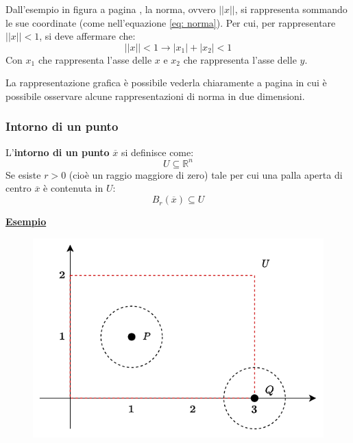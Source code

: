 \documentclass[a4paper]{article}
\newcommand{\definition}[1]{\textcolor{Red3}{\textbf{#1}}}
\newcommand{\example}[1]{\textcolor{Green4}{\textbf{#1}}}
\begin{document}
	\noindent
	Dall'esempio in figura a pagina \pageref{fig: esempio di norma}, la norma, ovvero $|| x ||$, si rappresenta sommando le sue coordinate (come nell'equazione \ref{eq: norma}). Per cui, per rappresentare $||x|| < 1$, si deve affermare che:
	\begin{equation*}
		|| x || < 1 \longrightarrow |x_{1}| + |x_{2}| < 1
	\end{equation*}
	Con $x_{1}$ che rappresenta l'asse delle $x$ e $x_{2}$ che rappresenta l'asse delle $y$.\newline

	\noindent
	La rappresentazione grafica è possibile vederla chiaramente a pagina \pageref{fig: alcune rappresentazioni di norme in due dimensioni} in cui è possibile osservare alcune rappresentazioni di norma in due dimensioni.\newpage

	\subsubsection{Intorno di un punto}\label{subsubsection: intorno di un punto}

	L'\definition{intorno di un punto} $\overline{x}$ si definisce come:
	\begin{equation*}
		U \subseteq \mathbb{R}^{n}
	\end{equation*}
	Se esiste $r > 0$ (cioè un raggio maggiore di zero) tale per cui una palla aperta di centro $\overline{x}$ è contenuta in $U$:
	\begin{equation*}
		B_{r}\left(\overline{x}\right) \subseteq U
	\end{equation*}

	\begin{flushleft}
		\example{\underline{Esempio}}
	\end{flushleft}

	\begin{figure}[!htp]
		\centering
		\includegraphics[width=.8\textwidth]{img/intorno_di_un_punto.pdf}
	\end{figure}
\end{document}

